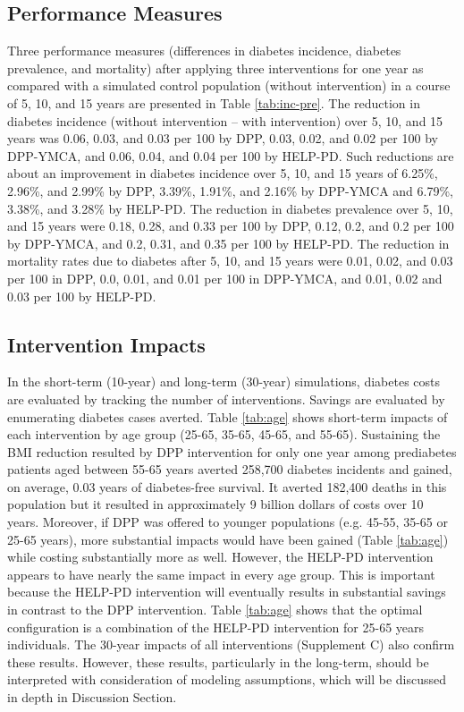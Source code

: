 \documentclass[fleqn,10pt]{wlscirep}
\begin{document}
\subsection*{Performance Measures}
Three performance measures (differences in diabetes incidence, diabetes prevalence, and mortality) after applying three interventions for one year as compared with a simulated control population (without intervention) in a course of 5, 10, and 15 years are presented in Table \ref{tab:inc-pre}. The reduction in diabetes incidence (without intervention – with intervention) over 5, 10, and 15 years was 0.06, 0.03, and 0.03 per 100 by DPP, 0.03, 0.02, and 0.02 per 100 by DPP-YMCA, and 0.06, 0.04, and 0.04 per 100 by HELP-PD.  Such reductions are about an improvement in diabetes incidence over 5, 10, and 15 years of 6.25\%, 2.96\%, and 2.99\% by DPP, 3.39\%, 1.91\%, and 2.16\% by DPP-YMCA and 6.79\%, 3.38\%, and 3.28\% by HELP-PD. The reduction in diabetes prevalence over 5, 10, and 15 years were 0.18, 0.28, and 0.33 per 100 by DPP, 0.12, 0.2, and 0.2 per 100 by DPP-YMCA, and 0.2, 0.31, and 0.35 per 100 by HELP-PD.  The reduction in mortality rates due to diabetes after 5, 10, and 15 years were 0.01, 0.02, and 0.03 per 100 in DPP, 0.0, 0.01, and 0.01 per 100 in DPP-YMCA, and 0.01, 0.02 and 0.03 per 100 by HELP-PD.

\subsection*{Intervention Impacts}
In the short-term (10-year) and long-term (30-year) simulations, diabetes costs are evaluated by tracking the number of interventions. Savings are evaluated by enumerating diabetes cases averted. Table \ref{tab:age} shows short-term impacts of each intervention by age group (25-65, 35-65, 45-65, and 55-65). Sustaining the BMI reduction resulted by DPP intervention for only one year among prediabetes patients aged between 55-65 years averted 258,700 diabetes incidents and gained, on average, 0.03 years of diabetes-free survival. It averted 182,400 deaths in this population but it resulted in approximately 9 billion dollars of costs over 10 years. Moreover, if DPP was offered to younger populations (e.g. 45-55, 35-65 or 25-65 years), more substantial impacts would have been gained (Table \ref{tab:age}) while costing substantially more as well. However, the HELP-PD intervention appears to have nearly the same impact in every age group. This is important because the HELP-PD intervention will eventually results in substantial savings in contrast to the DPP intervention. Table \ref{tab:age} shows that the optimal configuration is a combination of the HELP-PD intervention for 25-65 years individuals. The 30-year impacts of all interventions (Supplement C) also confirm these results. 
However, these results, particularly in the long-term, should be interpreted with consideration of modeling assumptions, which will be discussed in depth in Discussion Section.
\end{document}
